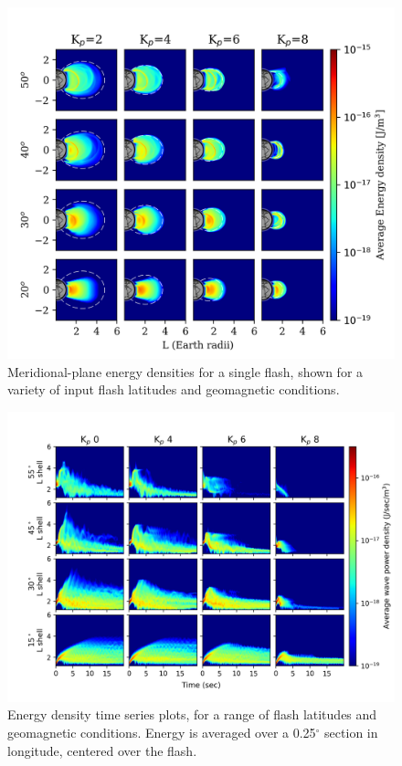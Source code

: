 \begin{figure}[h!]
\begin{center}
\includegraphics{figures/energy_from_single_flash_meridonal_plane.png}
\caption[Energy density in the meridional plane for a single flash]{Meridional-plane energy densities for a single flash, shown for a variety of input flash latitudes and geomagnetic conditions.}
\label{fig:energy_from_single_flash}
\end{center}
\end{figure}

\begin{figure}
\begin{center}
\includegraphics[angle=-90]{figures/wave_energy_timeseries_vs_L.png}
\caption[Energy density vs time vs L-shell]{Energy density time series plots, for a range of flash latitudes and geomagnetic conditions. Energy is averaged over a 0.25$^\circ$ section in longitude, centered over the flash.}
\label{fig:wave_energy_timeseries}
\end{center}
\end{figure}

